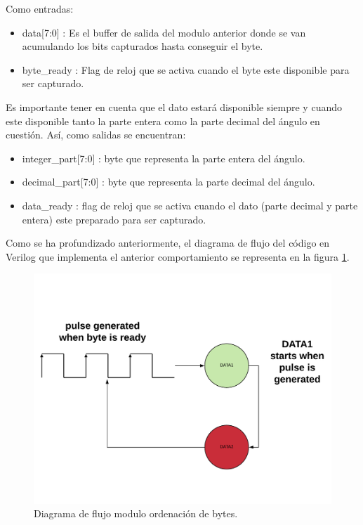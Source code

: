 Como entradas:

\begin{itemize}
	\item data[7:0] : Es el buffer de salida del modulo anterior donde se van acumulando los bits capturados hasta conseguir el byte.
	\item byte\_ready : Flag de reloj que se activa cuando el byte este disponible para ser capturado.
\end{itemize}

Es importante tener en cuenta que el dato estará disponible siempre y cuando este disponible tanto la parte entera como la parte decimal del ángulo en cuestión. Así, como salidas se encuentran:

\begin{itemize}
	\item integer\_part[7:0] : byte que representa la parte entera del ángulo.
	\item decimal\_part[7:0] : byte que representa la parte decimal del ángulo.
	\item data\_ready : flag de reloj que se activa cuando el dato (parte decimal y parte entera) este preparado para ser capturado.	
\end{itemize}

Como se ha profundizado anteriormente, el diagrama de flujo del código en Verilog que implementa el anterior comportamiento se representa en la figura \ref{fig:arrange_angle}.

\begin{figure}[H]
	\center
	\includegraphics[scale=0.5]{imagenes/Balancing_robot/arrange_angle.pdf}
	\caption{Diagrama de flujo modulo ordenación de bytes.}
	\label{fig:arrange_angle}
\end{figure}



